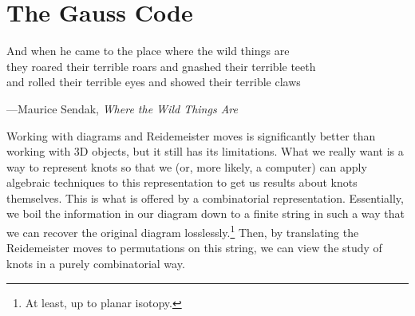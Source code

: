 \chapter{The Gauss Code}\label{chap:gauss-code}
\setlength{}
\epigraph{And when he came to the place where the wild things are\\
  they roared their terrible roars and gnashed their terrible teeth\\
  and rolled their terrible eyes and showed their terrible
  claws}{---Maurice Sendak, \emph{Where the Wild Things Are}}

Working with diagrams and Reidemeister moves is significantly better
than working with $3$D objects, but it still has its limitations. What
we really want is a way to represent knots so that we (or, more
likely, a computer) can apply algebraic techniques to this
representation to get us results about knots themselves. This is what
is offered by a combinatorial representation. Essentially, we boil the
information in our diagram down to a finite string in such a way that
we can recover the original diagram losslessly.\footnote{At least, up
  to planar isotopy.} Then, by translating the Reidemeister moves to
permutations on this string, we can view the study of knots in a
purely combinatorial way.

